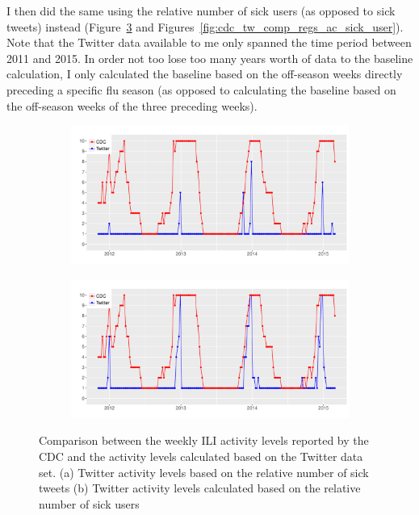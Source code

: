 \documentclass[11pt, a4paper,twoside]{report}\usepackage[]{graphicx}\usepackage[]{color}
\begin{document}
I then did the same using the relative number of sick users (as opposed to sick tweets) instead (Figure~\ref{fig:cdc_tw_comp_nat_ac_sick_user} and Figures~\ref{fig:cdc_tw_comp_regs_ac_sick_user}). Note that the Twitter data available to me only spanned the time period between 2011 and 2015. In order not too lose too many years worth of data to the baseline calculation, I only calculated the baseline based on the off-season weeks directly preceding a specific flu season (as opposed to calculating the baseline based on the off-season weeks of the three preceding weeks).

\begin{figure}[htbp!]
\centering
  \begin{subfigure}[t]{1\textwidth}
  \includegraphics[width=1\linewidth]{34_cdc_twitter_comp_nat_activity_sick.pdf}
    \caption{}
  \label{fig:cdc_tw_comp_nat_ac_sick}
  \end{subfigure}
  
  \begin{subfigure}[t]{1\textwidth}
  \includegraphics[width=1\linewidth]{35_cdc_twitter_comp_nat_activity_sick_user.pdf}
    \caption{}
  \label{fig:cdc_tw_comp_nat_ac_sick_user}
  \end{subfigure}
  
  \caption{Comparison between the weekly ILI activity levels reported by the CDC and the activity levels calculated based on the Twitter data set. (a) Twitter activity levels based on the relative number of sick tweets (b) Twitter activity levels calculated based on the relative number of sick users}
\end{figure}
\end{document}
